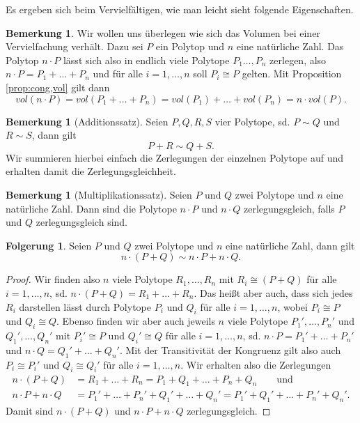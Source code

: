 \documentclass[11pt,titlepage]{article}
\theoremstyle{definition}
\newtheorem{corollary}[theorem]{Folgerung}
\newtheorem{remark}[theorem]{Bemerkung}
\theoremstyle{remark}
\begin{document}
	Es ergeben sich beim Vervielfältigen, wie man leicht sieht folgende Eigenschaften.
	
	\begin{remark}\label{bem:vervielf;vol}
		Wir wollen uns überlegen wie sich das Volumen bei einer Vervielfachung 
		verhält. Dazu sei $P$ ein Polytop und $n$ eine natürliche Zahl. 
		Das Polytop $n\cdot P$ lässt sich also in endlich viele Polytope 
		$P_1\ldots,P_n$ zerlegen, also $n\cdot P=P_1+\ldots+P_n$ und für alle 
		$i=1,\ldots,n$ soll $P_i\cong P$ gelten. Mit Proposition 
		\ref{prop:cong,vol} gilt dann 
		\[vol(n\cdot P)=vol(P_1+\ldots+P_n)=vol(P_1)+\ldots+vol(P_n)=n\cdot vol(P).\]
	\end{remark}
	
	\begin{remark}[Additionssatz] \label{bem:addsatz}
		Seien $P,Q,R,S$ vier Polytope, sd. $P\sim Q$ und $R\sim S$, dann gilt
		\[P+R\sim Q+S.\]
		Wir summieren hierbei einfach die Zerlegungen der einzelnen Polytope 
		auf und erhalten damit die Zerlegungsgleichheit.
	\end{remark}
	
	\begin{remark}[Multiplikationssatz] \label{bem:multsatz}
		Seien $P$ und $Q$ zwei Polytope und $n$ eine natürliche Zahl. 
		Dann sind die Polytope $n\cdot P$ und $n\cdot Q$ zerlegungsgleich, falls 
		$P$ und $Q$ zerlegungsgleich sind.
	\end{remark}
	
	\begin{corollary} \label{coroll:vervielfältigung}
		Seien $P$ und $Q$ zwei Polytope und $n$ eine natürliche Zahl, dann gilt
		\[n\cdot(P+Q)\sim n\cdot P+n\cdot Q.\]
	\end{corollary}
	
	\begin{proof}
		Wir finden also $n$ viele Polytope $R_1,\ldots,R_n$ mit 
		$R_i\cong (P+Q)$ für alle $i=1,\ldots,n$, sd. 
		$n\cdot(P+Q)=R_1+\ldots+R_n$. Das heißt aber auch, dass sich jedes 
		$R_i$ darstellen lässt durch Polytope $P_i$ und $Q_i$ für alle 
		$i=1,\ldots,n$, wobei $P_i\cong P$ und $Q_i\cong Q$. Ebenso finden wir 
		aber auch jeweils $n$ viele Polytope 
		$P_1',\ldots,P_n'$ und $Q_1',\ldots,Q_n'$ mit $P_i'\cong P$ und 
		$Q_i'\cong Q$ für alle $i=1,\ldots,n$, sd. $n\cdot P=P_1'+\ldots+P_n'$ und 
		$n\cdot Q=Q_1'+\ldots+Q_n'$. Mit der Transitivität der Kongruenz 
		gilt also auch $P_i\cong P_i'$ und $Q_i\cong Q_i'$ für alle 
		$i=1,\ldots,n$. Wir erhalten also die Zerlegungen
		\begin{align*}
		n\cdot(P+Q)&=R_1+\ldots+R_n=P_1+Q_1+\ldots+P_n+Q_n \qquad\text{und}\\
		n\cdot P+n\cdot Q&=P_1'+\ldots+P_n'+Q_1'+\ldots+Q_n'=
		P_1'+Q_1'+\ldots+P_n'+Q_n'.
		\end{align*}
		Damit sind $n\cdot (P+Q)$ und $n\cdot P+n\cdot Q$ zerlegungsgleich.
	\end{proof}
\end{document}
